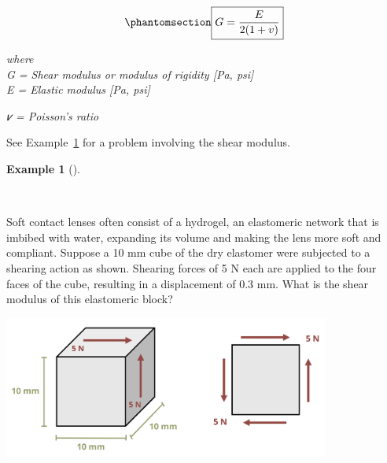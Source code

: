 \documentclass[
  letterpaper,
  DIV=11,
  numbers=noendperiod]{scrreprt}
\theoremstyle{definition}
\newtheorem{example}{Example}[chapter]
\theoremstyle{remark}
\begin{document}
\begin{equation}\phantomsection\label{eq-4.4}{
\boxed{G=\frac{E}{2(1+v)}}
}\end{equation}

\emph{where}\\
\emph{G = Shear modulus or modulus of rigidity {[}Pa, psi{]}}\\
\emph{E = Elastic modulus {[}Pa, psi{]}}

\emph{𝜈 = Poisson's ratio}

See Example~\ref{exm-4.3} for a problem involving the shear modulus.

\begin{tcolorbox}[enhanced jigsaw, leftrule=.75mm, bottomrule=.15mm, opacityback=0, opacitybacktitle=0.6, colframe=quarto-callout-tip-color-frame, toprule=.15mm, colbacktitle=quarto-callout-tip-color!10!white, coltitle=black, bottomtitle=1mm, title={Example 4.3}, titlerule=0mm, toptitle=1mm, colback=white, rightrule=.15mm, left=2mm, arc=.35mm, breakable]

\begin{example}[]\protect\hypertarget{exm-4.3}{}\label{exm-4.3}

~

Soft contact lenses often consist of a hydrogel, an elastomeric network
that is imbibed with water, expanding its volume and making the lens
more soft and compliant. Suppose a 10 mm cube of the dry elastomer were
subjected to a shearing action as shown. Shearing forces of 5 N each are
applied to the four faces of the cube, resulting in a displacement of
0.3 mm. What is the shear modulus of this elastomeric block?

\begin{center}
\includegraphics[width=4.22917in,height=\textheight]{images/Chapter 4 edits v2/example 4.3 v2.png}
\end{center}

\begin{tcolorbox}[enhanced jigsaw, leftrule=.75mm, bottomrule=.15mm, opacityback=0, opacitybacktitle=0.6, colframe=quarto-callout-tip-color-frame, toprule=.15mm, colbacktitle=quarto-callout-tip-color!10!white, coltitle=black, bottomtitle=1mm, title={Solution}, titlerule=0mm, toptitle=1mm, colback=white, rightrule=.15mm, left=2mm, arc=.35mm, breakable]


\end{tcolorbox}
\end{example}
\end{tcolorbox}
\end{document}
